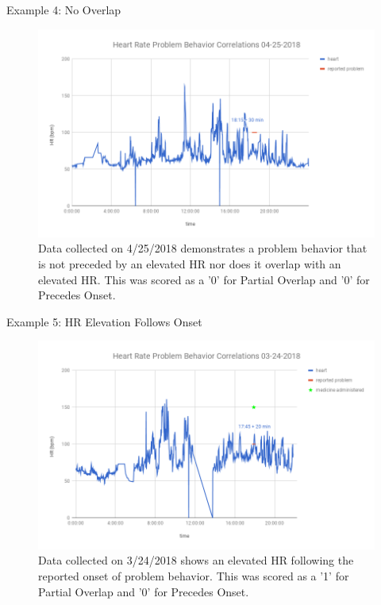 \documentclass[final]{beamer}
\newlength{\onecolwid}
\newlength{\twocolwid}
\begin{document}
\begin{frame}[t]
\begin{columns}[t]
\begin{column}{\twocolwid}
\begin{columns}[t,totalwidth=\twocolwid]
\begin{column}{\onecolwid}
\begin{block}{Example 4: No Overlap}
	\begin{figure}
		\includegraphics[width=0.8\linewidth]{Example4.png}
		\caption{Data collected on 4/25/2018 demonstrates a problem behavior that is not preceded by an elevated HR nor does it overlap with an elevated HR. This was scored as a '0' for Partial Overlap and '0' for Precedes Onset. }
	\end{figure}
	
\end{block}


\begin{block}{Example 5: HR Elevation Follows Onset}
	
	\begin{figure}
		\includegraphics[width=0.8\linewidth]{Example5.png}
		\caption{Data collected on 3/24/2018 shows an elevated HR following the reported onset of problem behavior. This was scored as a '1' for Partial Overlap and '0' for Precedes Onset.}
	\end{figure}
	
\end{block}


\end{column}
\end{columns}
\end{column}
\end{columns}
\end{frame}
\end{document}
